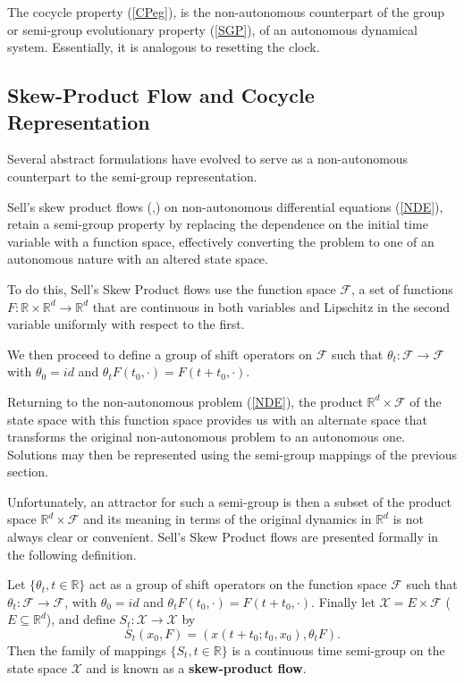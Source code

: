 The cocycle property (\ref{CPeg}), is the non-autonomous counterpart
of the group or semi-group evolutionary property (\ref{SGP}), of an
autonomous dynamical system. Essentially, it is analogous to resetting the
clock.

\subsection{Skew-Product Flow and Cocycle Representation}

Several abstract formulations have evolved to serve as a
non-autonomous counterpart to the semi-group representation.

Sell's skew product flows (\cite{Se67},\cite{Se71}) on
non-autonomous differential equations (\ref{NDE}), retain a
semi-group property by replacing the dependence on the initial
time variable with a function space, effectively converting the
problem to one of an autonomous nature with an altered state
space.

To do this, Sell's Skew Product flows use the function space
$\mathcal{F}$, a set of functions $F:\mathbb{R} \times \mathbb{R}^d
\to \mathbb{R}^d$ that are continuous in both variables and Lipschitz in the second variable uniformly with respect to the first. 

We then proceed to define a group of shift operators on $\mathcal{F}$ such that $\theta_t : \mathcal{F} \to \mathcal{F}$ with $\theta_0=id$ and $\theta_{t} F(t_0, \cdot) = F (t+t_0, \cdot)$. 

Returning to the non-autonomous problem (\ref{NDE}), the product $\mathbb{R}^d \times \mathcal{F}$ of the state space with  this function space provides us with an alternate space that transforms the original non-autonomous problem to an autonomous one. Solutions may then be represented using the semi-group mappings of the previous section.

Unfortunately, an attractor for such a semi-group is then a subset of the product space $\mathbb{R}^d \times \mathcal{F}$ and its meaning in terms of the original dynamics in $\mathbb{R}^d$ is not always clear or convenient. Sell's Skew Product flows are presented formally in the following definition.

\begin{defn}
  Let $\{ \theta_t, t \in \mathbb{R} \}$ act as a group of shift operators
  on the function space $\mathcal{F}$ such that
  $\theta_t : \mathcal{F} \to \mathcal{F}$, with $\theta_0=id$ and
  $\theta_{t} F(t_0, \cdot) = F(t+t_0, \cdot)$. Finally let $\mathcal{X}= E
  \times \mathcal{F}$ ($E \subseteq \mathbb{R}^d$), and define $S_t:\mathcal{X} \to  
  \mathcal{X}$ by
  \[ S_t(x_0,F) = (x(t+t_0;t_0, x_0),\theta_t F). \]
  Then the family of mappings $\{S_t, t \in \mathbb{R} \}$ is a
  continuous time semi-group on the state space $\mathcal{X}$ and is known as
  a {\bf skew-product flow}.
\end{defn}

